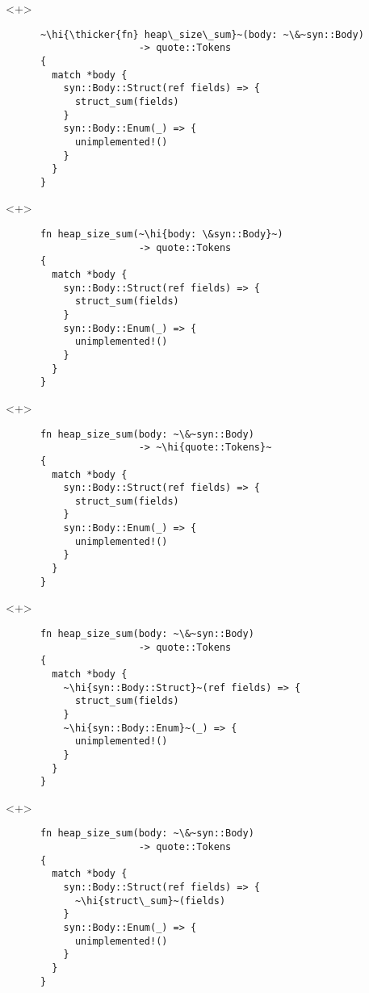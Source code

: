 \documentclass[usepdftitle=false]{beamer}
\renewcommand{\&}{\makebox[\widthof{\ampersand}][c]{\scalebox{0.9}[1.0]{\Book\ampersand}}}
\newcommand{\+}{\makebox[\widthof{+}][c]{\raisebox{-.2\height}{\scalefont{1.5}\Light+}}}
\newcommand{\thicker}[1]{\contourlength{0.26pt}\contour[10]{black}{#1}}
\newcommand{\hi}[1]{%
\tikz[baseline=(A.base)]
 \node[highlighting=0,inner sep=0pt,text depth=0pt] (A) {#1};%
}
\begin{document}
\begin{frame}[fragile]
  \begin{onlyenv}<+>
    \begin{verbatim}
      ~\hi{\thicker{fn} heap\_size\_sum}~(body: ~\&~syn::Body)
                       -> quote::Tokens
      {
        match *body {
          syn::Body::Struct(ref fields) => {
            struct_sum(fields)
          }
          syn::Body::Enum(_) => {
            unimplemented!()
          }
        }
      }
    \end{verbatim}
  \end{onlyenv}
  \begin{onlyenv}<+>
    \begin{verbatim}
      fn heap_size_sum(~\hi{body: \&syn::Body}~)
                       -> quote::Tokens
      {
        match *body {
          syn::Body::Struct(ref fields) => {
            struct_sum(fields)
          }
          syn::Body::Enum(_) => {
            unimplemented!()
          }
        }
      }
    \end{verbatim}
  \end{onlyenv}
  \begin{onlyenv}<+>
    \begin{verbatim}
      fn heap_size_sum(body: ~\&~syn::Body)
                       -> ~\hi{quote::Tokens}~
      {
        match *body {
          syn::Body::Struct(ref fields) => {
            struct_sum(fields)
          }
          syn::Body::Enum(_) => {
            unimplemented!()
          }
        }
      }
    \end{verbatim}
  \end{onlyenv}
  \begin{onlyenv}<+>
    \begin{verbatim}
      fn heap_size_sum(body: ~\&~syn::Body)
                       -> quote::Tokens
      {
        match *body {
          ~\hi{syn::Body::Struct}~(ref fields) => {
            struct_sum(fields)
          }
          ~\hi{syn::Body::Enum}~(_) => {
            unimplemented!()
          }
        }
      }
    \end{verbatim}
  \end{onlyenv}
  \begin{onlyenv}<+>
    \begin{verbatim}
      fn heap_size_sum(body: ~\&~syn::Body)
                       -> quote::Tokens
      {
        match *body {
          syn::Body::Struct(ref fields) => {
            ~\hi{struct\_sum}~(fields)
          }
          syn::Body::Enum(_) => {
            unimplemented!()
          }
        }
      }
    \end{verbatim}
  \end{onlyenv}
\end{frame}
\end{document}
